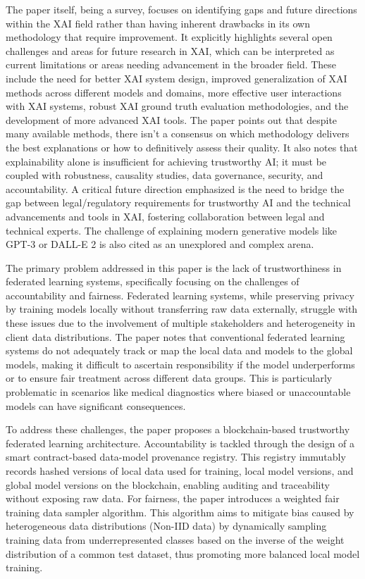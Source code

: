 The paper itself, being a survey, focuses on identifying gaps and future directions within the XAI field rather than having inherent drawbacks in its own methodology that require improvement. It explicitly highlights several open challenges and areas for future research in XAI, which can be interpreted as current limitations or areas needing advancement in the broader field. These include the need for better XAI system design, improved generalization of XAI methods across different models and domains, more effective user interactions with XAI systems, robust XAI ground truth evaluation methodologies, and the development of more advanced XAI tools. The paper points out that despite many available methods, there isn't a consensus on which methodology delivers the best explanations or how to definitively assess their quality. It also notes that explainability alone is insufficient for achieving trustworthy AI; it must be coupled with robustness, causality studies, data governance, security, and accountability. A critical future direction emphasized is the need to bridge the gap between legal/regulatory requirements for trustworthy AI and the technical advancements and tools in XAI, fostering collaboration between legal and technical experts. The challenge of explaining modern generative models like GPT-3 or DALL-E 2 is also cited as an unexplored and complex arena.


The primary problem addressed in this paper \cite{ali2023explainable} is the lack of trustworthiness in federated learning systems, specifically focusing on the challenges of accountability and fairness. Federated learning systems, while preserving privacy by training models locally without transferring raw data externally, struggle with these issues due to the involvement of multiple stakeholders and heterogeneity in client data distributions. The paper notes that conventional federated learning systems do not adequately track or map the local data and models to the global models, making it difficult to ascertain responsibility if the model underperforms or to ensure fair treatment across different data groups. This is particularly problematic in scenarios like medical diagnostics where biased or unaccountable models can have significant consequences.


To address these challenges, the paper proposes a blockchain-based trustworthy federated learning architecture. Accountability is tackled through the design of a smart contract-based data-model provenance registry. This registry immutably records hashed versions of local data used for training, local model versions, and global model versions on the blockchain, enabling auditing and traceability without exposing raw data. For fairness, the paper introduces a weighted fair training data sampler algorithm. This algorithm aims to mitigate bias caused by heterogeneous data distributions (Non-IID data) by dynamically sampling training data from underrepresented classes based on the inverse of the weight distribution of a common test dataset, thus promoting more balanced local model training.


